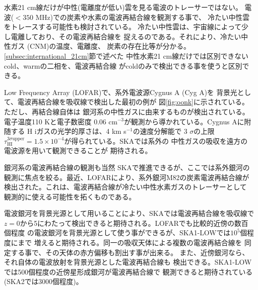 水素21 cm線だけが中性(電離度が低い)雲を見る電波のトレーサーではない。
電波($<350$ MHz)での炭素や水素の電波再結合線を観測する事で、
冷たい中性雲をトレースする可能性も検討されている\citep{oonk14}。
冷たい中性雲は、宇宙線によって少し電離しており、その電波再結合線を
捉えるのである。それにより、冷たい中性ガス
(CNM)の温度、電離度、
炭素の存在比等が分かる。\ref{subsec:international_21cm}節で述べた
中性水素21 cm線だけでは区別できないcold、warmの二相を、電波再結合線
がcoldのみで検出できる事を使うと区別できる。

Low Frequency Array (LOFAR)で、系外電波源Cygnus A (Cyg A)を
背景光として、電波再結合線を吸収線で検出した最初の例が
図\ref{fig:oonk}に示されている。ただし、再結合線自体は
銀河系の中性ガスに由来するものが検出されている。
電子温度110 Kと電子数密度
0.06 cm$^{-3}$が観測から導かれている。Cygnus Aに附随する
H {\sc i}ガスの光学的厚さは、4 km s$^{-1}$の速度分解能で
3 $\sigma$の上限$\tau_\mathrm{HI}^{3\sigma\text{upper}}=1.5\times 10^{-4}$が得られている。SKAでは系外の
中性ガスの吸収を遠方の電波源を用いて観測できることが
期待される。

銀河系の電波再結合線の観測も当然
SKAで推進できる\citep{oonk14}が、ここでは系外銀河の
観測に焦点を絞る。最近、LOFARにより、系外銀河M82の炭素電波再結合線が
検出された。これは、電波再結合線が冷たい中性水素ガスのトレーサーとして
観測的に使える可能性を拓くものである。

電波銀河を背景光源として用いることにより、SKAでは電波再結合線を吸収線で
$z=0$から5にわたって検出できると期待される。LOFARでも比較的近傍の数百個程度
の電波銀河を背景光源として使う事ができるが、SKA1-LOWでは$10^5$個程度にまで
増えると期待される\citep{oonk14}。同一の吸収天体による複数の電波再結合線を
同定する事で、その天体の赤方偏移も割出す事が出来る。
また、近傍銀河なら、それ自体の電波放射を背景光源とした電波再結合線も
検出できる。SKA1-LOWでは500個程度の近傍星形成銀河が電波再結合線で
観測できると期待されている(SKA2では3000個程度)。

